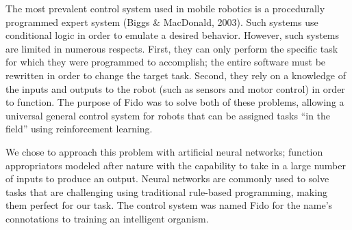 The most prevalent control system used in mobile robotics is a procedurally programmed expert system (Biggs \& MacDonald, 2003).  Such systems use conditional logic in order to emulate a desired behavior.  However, such systems are limited in numerous respects.  First, they can only perform the specific task for which they were programmed to accomplish; the entire software must be rewritten in order to change the target task.  Second, they rely on a knowledge of the inputs and outputs to the robot (such as sensors and motor control) in order to function.  The purpose of Fido was to solve both of these problems, allowing a universal general control system for robots that can be assigned tasks ``in the field'' using reinforcement learning.  

We chose to approach this problem with artificial neural networks; function appropriators modeled after nature with the capability to take in a large number of inputs to produce an output.  Neural networks are commonly used to solve tasks that are challenging using traditional rule-based programming, making them perfect for our task.  The control system was named Fido for the name's connotations to training an intelligent organism. 